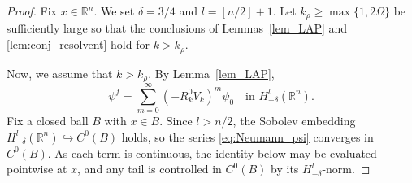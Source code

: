 \documentclass[12pt,a4paper]{amsart}
\numberwithin{equation}{section}
\theoremstyle{plain}
\theoremstyle{definition}
\begin{document}
\begin{proof}
Fix $x\in \mathbb{R}^n$. We set $\delta = 3/4$ and $l = [n/2]+1$. Let $k_\rho\geq\max\{1,2\Omega\}$ be sufficiently large so that the conclusions of
Lemmas~\ref{lem_LAP} and \ref{lem:conj_resolvent} hold for $k>k_\rho$.

Now, we assume that $k>k_{\rho}$. By Lemma~\ref{lem_LAP},
\begin{equation}\label{eq:Neumann_psi}
    \psi^{f}
    =
    \sum_{m=0}^\infty (-R_k^0 V_k)^m \psi_0
    \quad \text{in } H^l_{-\delta}(\mathbb{R}^n).
\end{equation}
Fix a closed ball $B$ with $x\in B$. Since $l>n/2$, the Sobolev embedding
$H^l_{-\delta}(\mathbb{R}^n)\hookrightarrow C^0(B)$ holds, so the series
\eqref{eq:Neumann_psi} converges in $C^0(B)$. As each term is continuous,
the identity below may be evaluated pointwise at $x$, and any tail is
controlled in $C^0(B)$ by its $H^l_{-\delta}$-norm.


\end{proof}
\end{document}
